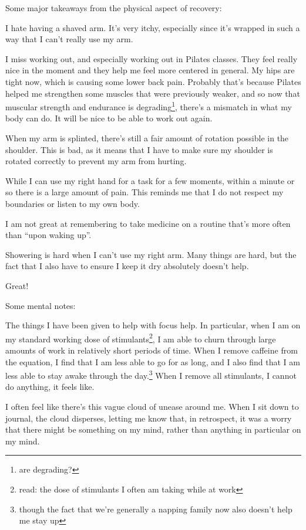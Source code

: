 \documentclass[12pt]{article}
\newcommand{\say}[1]{``#1''}
\renewcommand{\,}{\textsuperscript{,}}
\begin{document}
Some major takeaways from the physical aspect of recovery:

I hate having a shaved arm. It's very itchy, especially since it's wrapped in such a way that I can't really use my arm.

I miss working out, and especially working out in Pilates classes. They feel really nice in the moment and they help me feel more centered in general. My hips are tight now, which is causing some lower back pain. Probably that's because Pilates helped me strengthen some muscles that were previously weaker, and so now that muscular strength and endurance is degrading\footnote{are degrading?}, there's a mismatch in what my body can do. It will be nice to be able to work out again.

When my arm is splinted, there's still a fair amount of rotation possible in the shoulder. This is bad, as it means that I have to make sure my shoulder is rotated correctly to prevent my arm from hurting.

While I can use my right hand for a task for a few moments, within a minute or so there is a large amount of pain. This reminds me that I do not respect my boundaries or listen to my own body.

I am not great at remembering to take medicine on a routine that's more often than \say{upon waking up}.

Showering is hard when I can't use my right arm. Many things are hard, but the fact that I also have to ensure I keep it dry absolutely doesn't help.

Great!

Some mental notes:

The things I have been given to help with focus help. In particular, when I am on my standard working dose of stimulants\footnote{read: the dose of stimulants I often am taking while at work}, I am able to churn through large amounts of work in relatively short periods of time. When I remove caffeine from the equation, I find that I am less able to go for as long, and I also find that I am less able to stay awake through the day.\footnote{though the fact that we're generally a napping family now also doesn't help me stay up} When I remove all stimulants, I cannot do anything, it feels like.

I often feel like there's this vague cloud of unease around me. When I sit down to journal, the cloud disperses, letting me know that, in retrospect, it was a worry that there might be something on my mind, rather than anything in particular on my mind.
\end{document}
